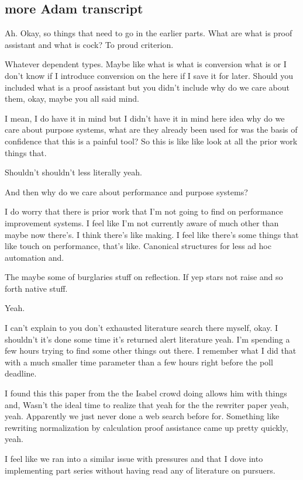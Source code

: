 \begin{subappendices}
\section{more Adam transcript}
Ah. Okay, so things that need to go in the earlier parts. What are what is proof assistant and what is cock? To proud criterion. 

Whatever dependent types. Maybe like what is what is conversion what is or I don't know if I introduce conversion on the here if I save it for later. Should you included what is a proof assistant but you didn't include why do we care about them, okay, maybe you all said mind. 

I mean, I do have it in mind but I didn't have it in mind here idea why do we care about purpose systems, what are they already been used for was the basis of confidence that this is a painful tool? So this is like like look at all the prior work things that. 

Shouldn't shouldn't less literally yeah. 

And then why do we care about performance and purpose systems? 

I do worry that there is prior work that I'm not going to find on performance improvement systems. I feel like I'm not currently aware of much other than maybe now there's. I think there's like making. I feel like there's some things that like touch on performance, that's like. Canonical structures for less ad hoc automation and. 

The maybe some of burglaries stuff on reflection. If yep stars not raise and so forth native stuff. 

Yeah. 

I can't explain to you don't exhausted literature search there myself, okay. I shouldn't it's done some time it's returned alert literature yeah. I'm spending a few hours trying to find some other things out there. I remember what I did that with a much smaller time parameter than a few hours right before the poll deadline. 

I found this this paper from the the Isabel crowd doing allows him with things and, Wasn't the ideal time to realize that yeah for the the rewriter paper yeah, yeah. Apparently we just never done a web search before for. Something like rewriting normalization by calculation proof assistance came up pretty quickly, yeah. 

I feel like we ran into a similar issue with pressures and that I dove into implementing part series without having read any of literature on pursuers. 


\end{subappendices}

